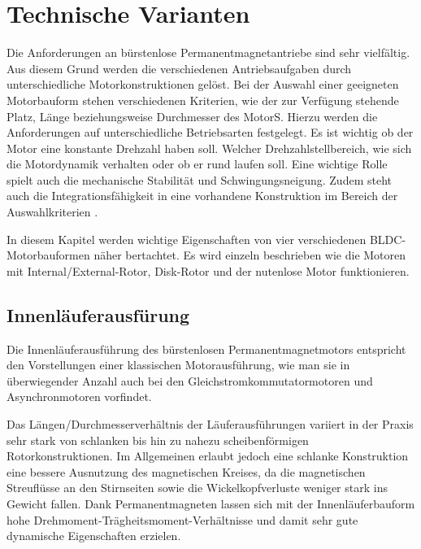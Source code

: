 \section{Technische Varianten}

Die Anforderungen an bürstenlose Permanentmagnetantriebe sind sehr vielfältig. Aus diesem Grund werden die verschiedenen Antriebsaufgaben durch unterschiedliche Motorkonstruktionen gelöst. Bei der Auswahl einer geeigneten Motorbauform stehen verschiedenen Kriterien, wie der zur Verfügung stehende Platz, Länge beziehungsweise Durchmesser des MotorS.  Hierzu werden die Anforderungen auf unterschiedliche Betriebsarten festgelegt. Es ist wichtig ob der Motor eine konstante Drehzahl haben soll. Welcher Drehzahlstellbereich, wie sich die Motordynamik verhalten oder ob er rund laufen soll. Eine wichtige Rolle spielt auch die mechanische Stabilität und Schwingungsneigung. Zudem steht auch die Integrationsfähigkeit in eine vorhandene Konstruktion im Bereich der Auswahlkriterien \parencite[S. 74]{Stölting2011}.

In diesem Kapitel werden wichtige Eigenschaften von vier verschiedenen BLDC-Motorbauformen näher bertachtet. Es wird einzeln beschrieben wie die Motoren mit Internal/External-Rotor, Disk-Rotor und der nutenlose Motor funktionieren.

\subsection{Innenläuferausfürung}
Die Innenläuferausführung des bürstenlosen Permanentmagnetmotors entspricht den Vorstellungen einer klassischen Motorausführung, wie man sie in überwiegender Anzahl auch bei den Gleichstromkommutatormotoren und Asynchronmotoren vorfindet.

Das Längen/Durchmesserverhältnis der Läuferausführungen variiert in der Praxis sehr stark von schlanken bis hin zu nahezu scheibenförmigen Rotorkonstruktionen. Im Allgemeinen erlaubt jedoch eine schlanke Konstruktion eine bessere Ausnutzung des magnetischen Kreises, da die magnetischen Streuflüsse an den Stirnseiten sowie die Wickelkopfverluste weniger stark ins Gewicht fallen. Dank Permanentmagneten lassen sich mit der Innenläuferbauform hohe Drehmoment-Trägheitsmoment-Verhältnisse und damit sehr gute dynamische Eigenschaften erzielen.

